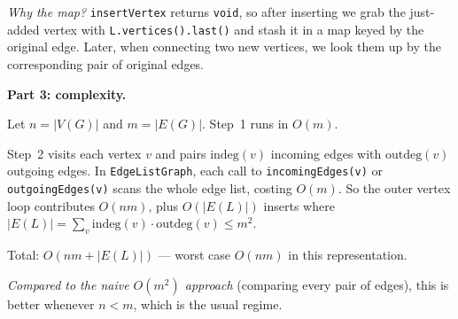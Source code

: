 \documentclass[11pt]{article}
\begin{document}
{\textit{Why the map?} \texttt{insertVertex} returns \texttt{void}, so after inserting we grab the just-added vertex with \texttt{L.vertices().last()} and stash it in a map keyed by the original edge. Later, when connecting two new vertices, we look them up by the corresponding pair of original edges.

\medskip

\textbf{Part 3: complexity.}

Let $n = |V(G)|$ and $m = |E(G)|$. Step~1 runs in $O(m)$.

Step~2 visits each vertex $v$ and pairs $\text{indeg}(v)$ incoming edges with $\text{outdeg}(v)$ outgoing edges. In \texttt{EdgeListGraph}, each call to \texttt{incomingEdges(v)} or \texttt{outgoingEdges(v)} scans the whole edge list, costing $O(m)$. So the outer vertex loop contributes $O(nm)$, plus $O(|E(L)|)$ inserts where $|E(L)| = \sum_v \text{indeg}(v) \cdot \text{outdeg}(v) \leq m^2$.

\smallskip

Total: $\boxed{O(nm + |E(L)|)}$ --- worst case $O(nm)$ in this representation.

\smallskip

\textit{Compared to the naive $O(m^2)$ approach} (comparing every pair of edges), this is better whenever $n < m$, which is the usual regime.

}
\end{document}
